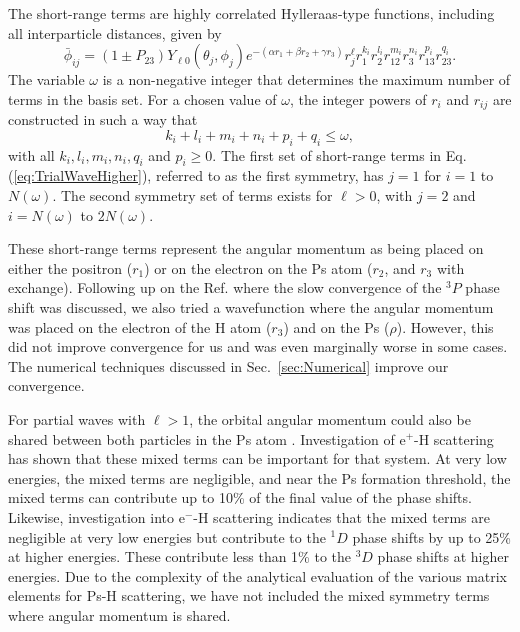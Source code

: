 \documentclass[preprint,showpacs,showkeys,preprintnumbers,amsmath,amssymb,longbibliography,pra,aps]{revtex4-1}
\begin{document}
The short-range terms are highly correlated Hylleraas-type functions, including
all interparticle distances, given by
\begin{equation}
\label{eq:PhiDef}
\bar{\phi}_{ij} = \left(1 \pm P_{23}\right) Y_{\ell 0}(\theta_j,\phi_j)
e^{-(\alpha r_1 + \beta r_2 + \gamma r_3)}
r_j^{\ell} r_1^{k_i} r_2^{l_i} r_{12}^{m_i} r_3^{n_i} r_{13}^{p_i} r_{23}^{q_i}.
\end{equation}
The variable $\omega$ is a non-negative integer that determines the maximum
number of terms in the basis set. For a chosen value of $\omega$, the integer
powers of $r_i$ and $r_{ij}$ are constructed in such a way that 
\begin{equation}
k_i + l_i + m_i + n_i + p_i + q_i \leq \omega,
\end{equation}
with all $k_i, l_i, m_i, n_i, q_i$ and $p_i \geq 0$.
The first set of short-range terms in Eq. (\ref{eq:TrialWaveHigher}), referred
to as the first symmetry, has $j=1$ for $i=1$ to $N(\omega)$. The second
symmetry set of terms exists for $\ell > 0$, with $j=2$ and $i = N(\omega)$ to
$2N(\omega)$.

These short-range terms represent the angular momentum as being placed on 
either the positron ($r_1$) or on the electron on the Ps atom ($r_2$, and $r_3$
with exchange). Following up on the Ref. \cite{VanReeth2004} where the slow 
convergence of the $^3P$ phase shift was discussed, we also tried a 
wavefunction where the angular momentum was placed on the electron of the H 
atom ($r_3$) and on the Ps ($\rho$). However, this did not improve 
convergence for us and was even marginally worse in some cases. The numerical 
techniques discussed in Sec.~\ref{sec:Numerical} improve our convergence.

For partial waves with $\ell>1$, the orbital angular momentum could also be 
shared between both particles in the Ps atom \cite{Schwartz1961a}. 
Investigation of e$^+$-H scattering \cite{VanReeth2015} has shown 
that these mixed terms can be important for that 
system. At very low energies, the mixed terms are negligible, and near
the Ps formation threshold, the mixed terms can contribute up to 10\%
of the final value of the phase shifts. Likewise, investigation into
e$^-$-H scattering \cite{VanReeth2015} indicates that the mixed terms
are negligible at very low energies but contribute to the $^1D$ phase
shifts by up to 25\% at higher energies. These contribute less than 1\%
to the $^3D$ phase shifts at higher energies.
Due to the complexity of the analytical evaluation of the various 
matrix elements for Ps-H scattering, we have not included the mixed
symmetry terms where angular momentum is shared.
\end{document}
